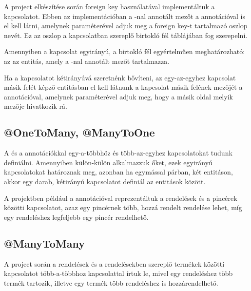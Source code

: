 A project elkészítése során foreign key használatával implementáltuk a kapcsolatot. Ebben az implementációban a -nal annotált mezőt a  annotációval is el kell látni, amelynek  paraméterével adjuk meg a foreign key-t tartalmazó oszlop nevét. Ez az oszlop a kapcsolatban szereplő birtokló fél táblájában fog szerepelni. \par

Amennyiben a kapcsolat egyirányú, a birtokló fél egyértelműen meghatározható: az az entitás, amely a -nal annotált mezőt tartalmazza.\par

Ha a kapcsolatot kétirányúvá szeretnénk bővíteni, az egy-az-egyhez kapcsolat másik felét képző entitásban el kell látnunk a kapcsolat másik felének mezőjét a  annotációval, amelynek  paraméterével adjuk meg, hogy a másik oldal melyik mezője hivatkozik rá. \par


\subsection{@OneToMany, @ManyToOne}
A  és a  annotációkkal egy-a-többhöz és több-az-egyhez kapcsolatokat tudunk definiálni. Amennyiben külön-külön alkalmazzuk őket, ezek egyirányú kapcsolatokat határoznak meg, azonban ha egymással párban, két entitáson, akkor egy darab, kétirányú kapcsolatot definiál az entitások között. \par

A projektben például a  annotációval reprezentáltuk a rendelések és a pincérek közötti kapcsolatot, azaz egy pincérnek több, hozzá rendelt rendelése lehet, míg egy rendeléshez legfeljebb egy pincér rendelhető.


\subsection{@ManyToMany}

A project során a rendelések és a rendelésekben szereplő termékek közötti kapcsolatot több-a-többhoz kapcsolattal írtuk le, mivel egy rendeléshez több termék tartozik, illetve egy termék több rendeléshez is hozzárendelhető. \par

